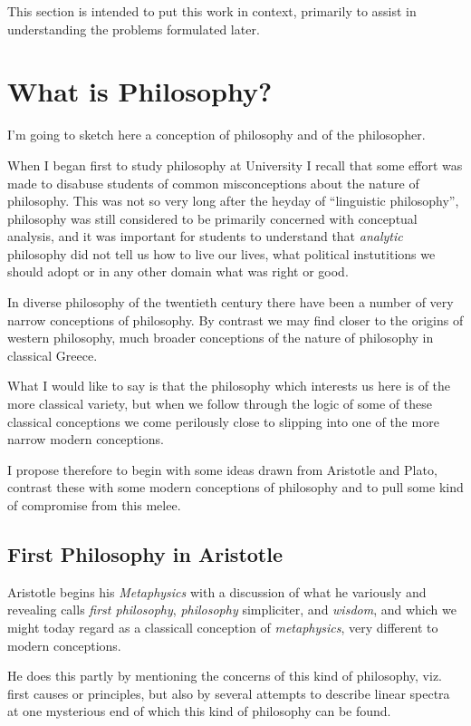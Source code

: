 \documentclass{rbjk}
\begin{document}
\begin{article}
This section is intended to put this work in context, primarily to assist in understanding the problems formulated later.

\section{What is Philosophy?}

I'm going to sketch here a conception of philosophy and of the philosopher.

When I began first to study philosophy at University I recall that some effort was made to disabuse students of common misconceptions about the nature of philosophy.
This was not so very long after the heyday of ``linguistic philosophy'', philosophy was still considered to be primarily concerned with conceptual analysis, and it was important for students to understand that {\it analytic} philosophy did not tell us how to live our lives, what political instutitions we should adopt or in any other domain what was right or good.

In diverse philosophy of the twentieth century there have been a number of very narrow conceptions of philosophy.
By contrast we may find closer to the origins of western philosophy, much broader conceptions of the nature of philosophy in classical Greece.

What I would like to say is that the philosophy which interests us here is of the more classical variety, but when we follow through the logic of some of these classical conceptions we come perilously close to slipping into one of the more narrow modern conceptions.

I propose therefore to begin with some ideas drawn from Aristotle and Plato, contrast these with some modern conceptions of philosophy and to pull some kind of compromise from this melee.
 
\subsection{First Philosophy in Aristotle}

Aristotle begins his {\it Metaphysics} with a discussion of what he variously and revealing calls {\it first philosophy}, {\it philosophy} simpliciter, and {\it wisdom}, and which we might today regard as a classicall conception of {\it metaphysics}, very different to modern conceptions.

He does this partly by mentioning the concerns of this kind of philosophy, viz. first causes or principles, but also by several attempts to describe linear spectra at one mysterious end of which this kind of philosophy can be found.


\end{article}
\end{document}
